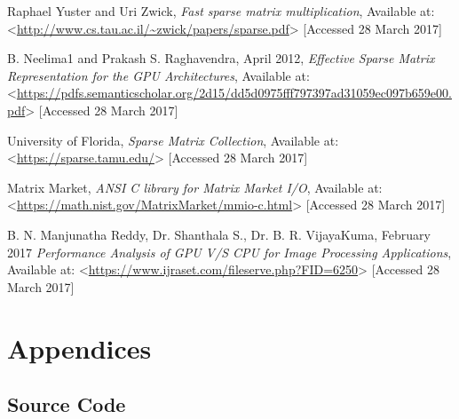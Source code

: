 \documentclass[12pt]{article}
\begin{document}
\newpage
\begin{thebibliography}{0}

Raphael Yuster and Uri Zwick, \textit{Fast sparse matrix multiplication}, Available at: <\url{http://www.cs.tau.ac.il/~zwick/papers/sparse.pdf}> [Accessed 28 March 2017]

B. Neelima1 and Prakash S. Raghavendra, April 2012,  \textit{Effective Sparse Matrix Representation for the
GPU Architectures}, Available at: <\url{https://pdfs.semanticscholar.org/2d15/dd5d0975fff797397ad31059ec097b659e00.pdf}> [Accessed 28 March 2017]

University of Florida, \textit{Sparse Matrix Collection}, Available at: <\url{https://sparse.tamu.edu/}> [Accessed 28 March 2017]

Matrix Market, \textit{ANSI C library for Matrix Market I/O}, Available at: <\url{https://math.nist.gov/MatrixMarket/mmio-c.html}> [Accessed 28 March 2017]

B. N. Manjunatha Reddy, Dr. Shanthala S., Dr. B. R. VijayaKuma, February 2017 \textit{Performance Analysis of GPU V/S CPU for Image
Processing Applications}, Available at: <\url{https://www.ijraset.com/fileserve.php?FID=6250}> [Accessed 28 March 2017]


\end{thebibliography}
\newpage

\section*{Appendices}


\newpage

\subsection*{Source Code}


\end{document}
